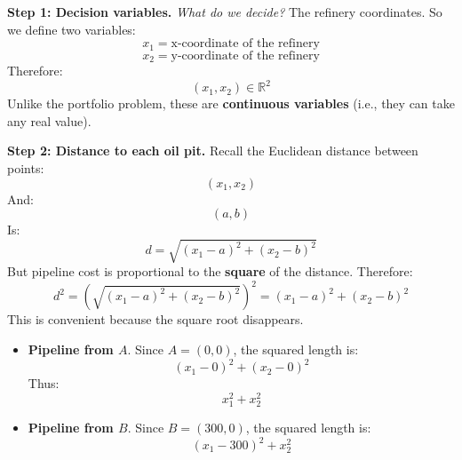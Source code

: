 \begin{examplebox}
    \highspace
    \textcolor{Green3}{ \textbf{Step 1: Decision variables.}} \emph{What do we decide?} The refinery coordinates. So we define two variables:
    \begin{equation*}
        x_1=\text{x-coordinate of the refinery}
    \end{equation*}
    \begin{equation*}
        x_2=\text{y-coordinate of the refinery}
    \end{equation*}
    Therefore:
    \begin{equation*}
        (x_1,x_2)\in\mathbb R^2
    \end{equation*}
    Unlike the portfolio problem, these are \textbf{continuous variables} (i.e., they can take any real value).

    \highspace
    \textcolor{Green3}{ \textbf{Step 2: Distance to each oil pit.}} Recall the Euclidean distance between points:
    \begin{equation*}
        (x_1,x_2)
    \end{equation*}
    And:
    \begin{equation*}
        (a,b)
    \end{equation*}
    Is:
    \begin{equation*}
        d=\sqrt{(x_1-a)^2+(x_2-b)^2}
    \end{equation*}
    But pipeline cost is proportional to the \textbf{square} of the distance. Therefore:
    \begin{equation*}
        d^2 = \left(\sqrt{(x_1-a)^2+(x_2-b)^2}\right)^{2} = (x_1-a)^2+(x_2-b)^2
    \end{equation*}
    This is convenient because the square root disappears.
    \begin{itemize}
        \item \textbf{Pipeline from $A$}. Since $A=(0,0)$, the squared length is:
            \begin{equation*}
                (x_1-0)^2+(x_2-0)^2
            \end{equation*}
            Thus:
            \begin{equation*}
                x_1^2+x_2^2
            \end{equation*}

        \item \textbf{Pipeline from $B$}. Since $B=(300,0)$, the squared length is:
            \begin{equation*}
                (x_1-300)^2+x_2^2
            \end{equation*}


\end{itemize}
\end{examplebox}
